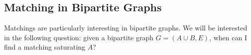\subsection{Matching in Bipartite Graphs}

Matchings are particularly interesting in bipartite graphs. We will be interested in the following question: given a bipartite graph $G = (A \cup B, E)$, when can I find a matching saturating $A$?

\begin{center}
	


\begin{tikzpicture}[x=0.75pt,y=0.75pt,yscale=-1,xscale=1]


\end{tikzpicture}
\end{center}
